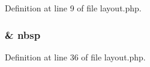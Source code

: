 Definition at line 9 of file layout.\-php.

\hypertarget{presse_2templates_2layout_8php_aef915316f784c9063d942974538301a6}{
\subsubsection[{nbsp}]{\setlength{\rightskip}{0pt plus 5cm}\& nbsp}}\label{presse_2templates_2layout_8php_aef915316f784c9063d942974538301a6}


Definition at line 36 of file layout.\-php.

